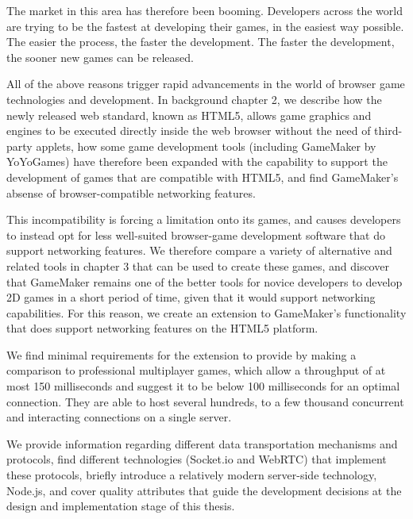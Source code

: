 \documentclass[bsc, 12pt, twoside, singlespacing, parskip, abbrevs, notimes, normalheadings, logo, deptreport]{styles/infthesis}
\begin{document}
\vspace{1em}
The market in this area has therefore been booming. Developers across the world are trying to be the fastest at developing their games, in the easiest way possible. The easier the process, the faster the development. The faster the development, the sooner new games can be released.

\vspace{1em}
All of the above reasons trigger rapid advancements in the world of browser game technologies and development. In background chapter 2, we describe how the newly released web standard, known as HTML5, allows game graphics and engines to be executed directly inside the web browser without the need of third-party applets, how some game development tools (including GameMaker by YoYoGames) have therefore been expanded with the capability to support the development of games that are compatible with HTML5, and find GameMaker's absense of browser-compatible networking features.

\vspace{1em}
This incompatibility is forcing a limitation onto its games, and causes developers to instead opt for less well-suited browser-game development software that do support networking features. We therefore compare a variety of alternative and related tools in chapter 3 that can be used to create these games, and discover that GameMaker remains one of the better tools for novice developers to develop 2D games in a short period of time, given that it would support networking capabilities. For this reason, we create an extension to GameMaker's functionality that does support networking features on the HTML5 platform.

\vspace{2em}
We find minimal requirements for the extension to provide by making a comparison to professional multiplayer games, which allow a throughput of at most 150 milliseconds and suggest it to be below 100 milliseconds for an optimal connection. They are able to host several hundreds, to a few thousand concurrent and interacting connections on a single server. 

\vspace{1em}
We provide information regarding different data transportation mechanisms and protocols, find different technologies (Socket.io and WebRTC) that implement these protocols, briefly introduce a relatively modern server-side technology, Node.js, and cover quality attributes that guide the development decisions at the design and implementation stage of this thesis.
\end{document}
